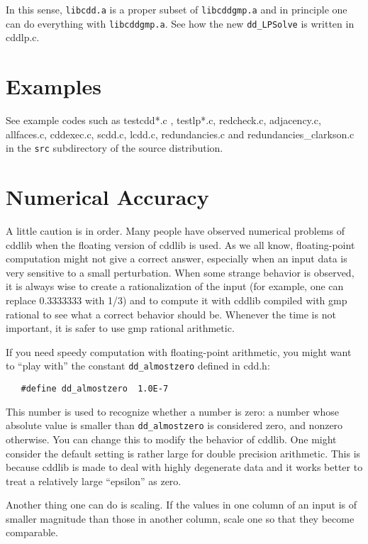 \documentclass[11pt]{article}
\newcommand {\0} {{\bf 0}}
\begin{document}
In this sense,  {\tt libcdd.a} is a proper subset of  {\tt libcddgmp.a} and in principle one can
do everything with  {\tt libcddgmp.a}.   See how the new {\tt dd\_LPSolve} is written in
cddlp.c.


\section{Examples}  \label{EXAMPLES}

See example codes such as testcdd*.c , testlp*.c, redcheck.c, adjacency.c, allfaces.c,
cddexec.c, scdd.c, lcdd.c, redundancies.c and redundancies\_clarkson.c
in the {\tt src}
subdirectory of the source distribution.

\section{Numerical Accuracy}  \label{accuracy}
 A little caution is in order.  Many people have observed
numerical problems of cddlib when the floating version of cddlib
is used.   As we all know, floating-point computation
might not give a correct answer, especially when an input
data is very sensitive to a small perturbation.  When
some strange behavior is observed, it is always wise
to create a rationalization of the input
(for example, one can replace 0.3333333 with 1/3)
and to compute it with cddlib compiled with gmp rational
to see what a correct behavior should be.  Whenever the time
is not important, it is safer to use gmp rational arithmetic.

If you need speedy computation with floating-point arithmetic,
you might want to ``play with'' the constant {\tt dd\_almostzero}
defined in cdd.h:

\begin{verbatim}
   #define dd_almostzero  1.0E-7
\end{verbatim}
\noindent
This number is used to recognize whether a number is zero:
a number whose absolute value is smaller
than {\tt dd\_almostzero} is considered zero, and nonzero otherwise.
You can change this to modify the behavior of cddlib.  One might
consider the default setting is rather large for double
precision arithmetic.  This is because cddlib is made
to deal with highly degenerate data and it works better
to treat a relatively large ``epsilon'' as zero.

Another thing one can do is scaling.  If the values in one column of
an input is of smaller magnitude than those in another column,
scale one so that they become comparable.
\end{document}
